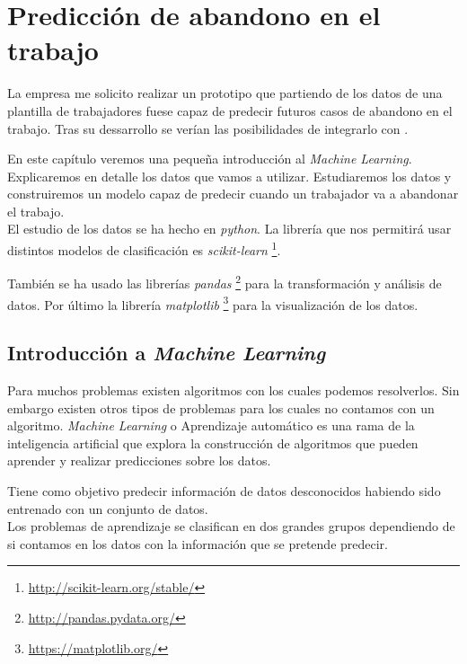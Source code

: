 \chapter{Predicción de abandono en el trabajo}

La empresa me solicito realizar un prototipo que partiendo de los datos de una plantilla de trabajadores fuese capaz de predecir futuros casos de abandono en el trabajo.
Tras su dessarrollo se verían las posibilidades de integrarlo con \wday{}.

En este capítulo veremos una pequeña introducción al \textit{Machine Learning}.
Explicaremos en detalle los datos que vamos a utilizar. Estudiaremos los datos y construiremos un modelo capaz de predecir cuando un trabajador va a abandonar el trabajo.\\



El estudio de los datos se ha hecho en \textit{python}. La librería que nos permitirá usar distintos modelos de clasificación es \textit{scikit-learn} \footnote{\url{http://scikit-learn.org/stable/}}.

También se ha usado las librerías \textit{pandas} \footnote{\url{http://pandas.pydata.org/}} para la transformación y análisis de datos. Por último la librería \textit{matplotlib} \footnote{\url{https://matplotlib.org/}} para la visualización de los datos.\\





\section{Introducción a \textit{Machine Learning}}

Para muchos problemas existen algoritmos con los cuales podemos resolverlos. Sin embargo existen otros tipos de problemas para los cuales no contamos con un algoritmo. 
\textit{Machine Learning} o Aprendizaje automático es una rama de la inteligencia artificial que explora la construcción de algoritmos que pueden aprender y realizar predicciones sobre los datos.



Tiene como objetivo predecir información de datos desconocidos habiendo sido entrenado con un conjunto de datos.\\



Los problemas de aprendizaje se clasifican en dos grandes grupos dependiendo de si contamos en los datos con la información que se pretende predecir.

